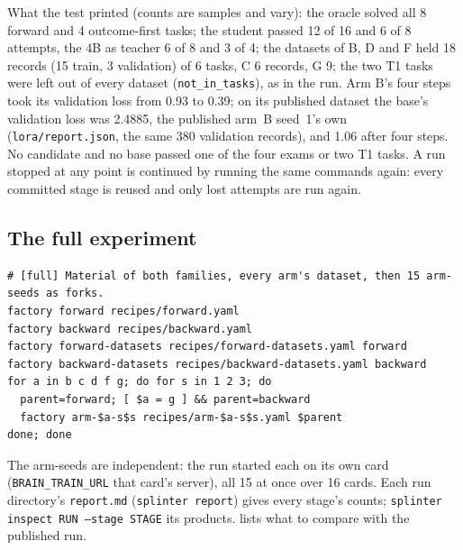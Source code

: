 \begin{sloppypar}
What the test printed (counts are samples and vary): the oracle solved all 8 forward and 4 outcome-first tasks; the student
passed 12 of 16 and 6 of 8 attempts, the 4B as teacher 6 of 8 and 3 of 4; the datasets of B, D and F held 18 records (15
train, 3 validation) of 6 tasks, C 6 records, G 9; the two T1 tasks were left out of every dataset (\texttt{not\_in\_tasks}),
as in the run. Arm B's four steps took its validation loss from 0.93 to 0.39; on its published dataset the base's validation
loss was 2.4885, the published arm~B seed~1's own (\texttt{lora/report.json}, the same 380 validation records), and 1.06
after four steps. No candidate and no base passed one of the four exams or two T1 tasks.
A run stopped at any point is continued by running the same commands again: every committed stage is reused and only lost
attempts are run again.
\end{sloppypar}

\subsection{The full experiment}\label{app:repro-vim-full}

{\scriptsize
\begin{verbatim}
# [full] Material of both families, every arm's dataset, then 15 arm-seeds as forks.
factory forward recipes/forward.yaml
factory backward recipes/backward.yaml
factory forward-datasets recipes/forward-datasets.yaml forward
factory backward-datasets recipes/backward-datasets.yaml backward
for a in b c d f g; do for s in 1 2 3; do
  parent=forward; [ $a = g ] && parent=backward
  factory arm-$a-s$s recipes/arm-$a-s$s.yaml $parent
done; done
\end{verbatim}
}

\begin{sloppypar}
The arm-seeds are independent: the run started each on its own card (\texttt{BRAIN\_TRAIN\_URL} that card's server), all 15 at
once over 16 cards. Each run directory's \texttt{report.md} (\texttt{splinter report}) gives every stage's counts;
\texttt{splinter inspect RUN --stage STAGE} its products.  lists what to compare with the published
run.
\end{sloppypar}

